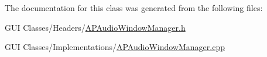 The documentation for this class was generated from the following files\+:\begin{DoxyCompactItemize}
\item 
G\+U\+I Classes/\+Headers/\hyperlink{_a_p_audio_window_manager_8h}{A\+P\+Audio\+Window\+Manager.\+h}\item 
G\+U\+I Classes/\+Implementations/\hyperlink{_a_p_audio_window_manager_8cpp}{A\+P\+Audio\+Window\+Manager.\+cpp}\end{DoxyCompactItemize}
